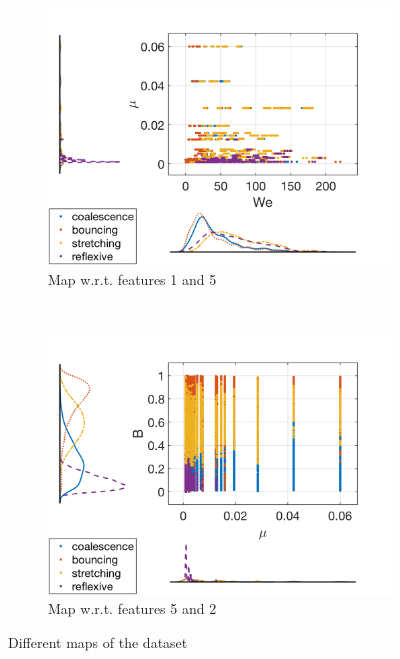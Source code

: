 \documentclass{article}
\begin{document}
\begin{figure}[h!]
    ~ %
    \begin{subfigure}[b]{0.4\textwidth}
        \includegraphics[width=\textwidth]{../figures/data_scatterhist3.png}
        \caption{Map w.r.t. features 1 and 5 }
        \label{fig:data3}
    \end{subfigure}
        ~ %
    \begin{subfigure}[b]{0.4\textwidth}
        \includegraphics[width=\textwidth]{../figures/data_scatterhist4.png}
        \caption{Map w.r.t. features 5 and 2 }
        \label{fig:data4}
    \end{subfigure}
    \caption{Different maps of the dataset}\label{fig:animals}
\end{figure}
\end{document}

